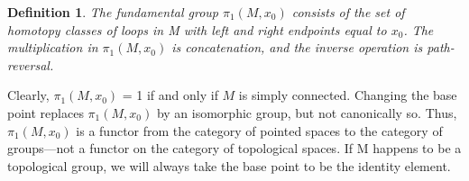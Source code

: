 \documentclass[12pt]{article}
\theoremstyle{plain}
\newtheorem{defi}{Definition}
\begin{document}
\begin{defi}
	The fundamental group $\pi_1(M,x_0)$ consists of the set of homotopy classes of loops in M with left and right endpoints equal to $x_0$. The multiplication in $\pi_1(M,x_0)$ is concatenation, and the inverse operation is path-reversal. 
\end{defi}

Clearly, $\pi_1(M,x_0)$ = 1 if and only if $M$ is simply connected. Changing the base point replaces $\pi_1(M,x_0)$ by an isomorphic group, but not canonically so. Thus, $\pi_1(M,x_0)$ is a functor from the category of pointed spaces to the category of groups—not a functor on the category of topological spaces. If M happens to be a topological group, we will always take the base point to be the identity element.
\end{document}
